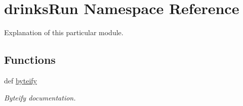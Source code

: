 \hypertarget{namespacedrinksRun}{\section{drinks\-Run Namespace Reference}
\label{namespacedrinksRun}
}


Explanation of this particular module.  


\subsection*{Functions}
\begin{DoxyCompactItemize}
\item 
def \hyperlink{namespacedrinksRun_ab0005a4ca74f8f8a23c70619924a4da7}{byteify}
\begin{DoxyCompactList}\small\item\em Byteify documentation. \end{DoxyCompactList}\end{DoxyCompactItemize}
